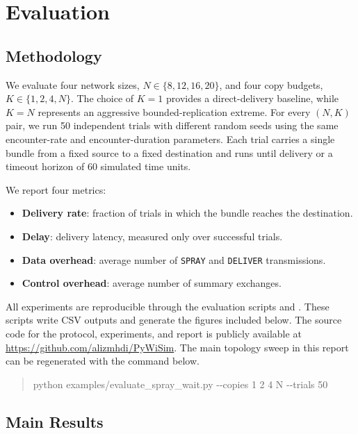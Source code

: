 \section{Evaluation}

\subsection{Methodology}

We evaluate four network sizes, $N \in \{8, 12, 16, 20\}$, and four copy budgets, $K \in \{1, 2, 4, N\}$. The choice of $K{=}1$ provides a direct-delivery baseline, while $K{=}N$ represents an aggressive bounded-replication extreme. For every $(N,K)$ pair, we run 50 independent trials with different random seeds using the same encounter-rate and encounter-duration parameters. Each trial carries a single bundle from a fixed source to a fixed destination and runs until delivery or a timeout horizon of 60 simulated time units.

We report four metrics:
\begin{itemize}
    \item \textbf{Delivery rate}: fraction of trials in which the bundle reaches the destination.
    \item \textbf{Delay}: delivery latency, measured only over successful trials.
    \item \textbf{Data overhead}: average number of \texttt{SPRAY} and \texttt{DELIVER} transmissions.
    \item \textbf{Control overhead}: average number of summary exchanges.
\end{itemize}

All experiments are reproducible through the evaluation scripts  and . These scripts write CSV outputs and generate the figures included below. The source code for the protocol, experiments, and report is publicly available at \url{https://github.com/alizmhdi/PyWiSim}. The main topology sweep in this report can be regenerated with the command below.

\begin{quote}
\small\ttfamily
python examples/evaluate\_spray\_wait.py -{}-copies 1 2 4 N -{}-trials 50
\end{quote}

\subsection{Main Results}

